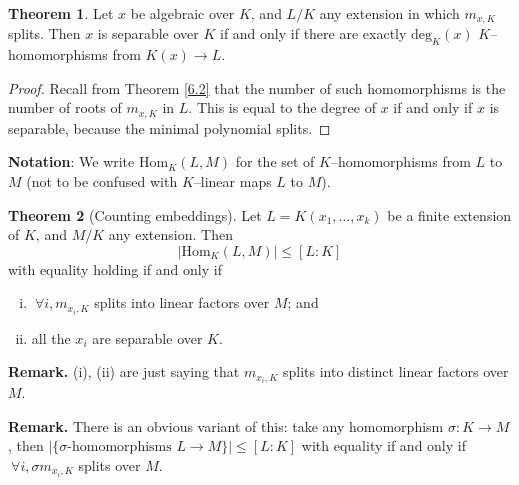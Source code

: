 \documentclass{article}
\theoremstyle{definition}
\newtheorem{theorem}{Theorem}[section]
\begin{document}
\begin{theorem}\label{8.4}
    Let $x$ be algebraic over $K$, and $L/K$ any extension in which $m_{x,K}$ splits. Then $x$ is separable over $K$ if and only if there are exactly $\text{deg}_K(x)$ $K$--homomorphisms from $K(x) \to L$.
\end{theorem}
\begin{proof}
    Recall from Theorem \ref{6.2} that the number of such homomorphisms is the number of roots of $m_{x,K}$ in $L$. This is equal to the degree of $x$ if and only if $x$ is separable, because the minimal polynomial splits.
\end{proof}


\textbf{Notation}: We write $\text{Hom}_K(L,M)$ for the set of $K$--homomorphisms from $L$ to $M$ (not to be confused with $K$--linear maps $L$ to $M$).

\begin{theorem}[Counting embeddings]\label{8.5}
    Let $L=K(x_1,\ldots,x_k)$ be a finite extension of $K$, and $M/K$ any extension. Then $$|\text{Hom}_K(L,M)|\le [L : K]$$ with equality holding if and only if
    \begin{enumerate}[(i)]
        \item $~\forall i, m_{x_i,K}$ splits into linear factors over $M$; and
        \item all the $x_i$ are separable over $K$.
    \end{enumerate}
\end{theorem}
\textbf{Remark.} (i), (ii) are just saying that $m_{x_i,K}$ splits into distinct linear factors over $M$.

\textbf{Remark.} There is an obvious variant of this: take any homomorphism $\sigma : K \to M$, then $|\{\sigma \text{-homomorphisms }L \to M\}| \le [L:K]$ with equality if and only if $~\forall i, \sigma m_{x_i,K}$ splits over $M$.
\end{document}
